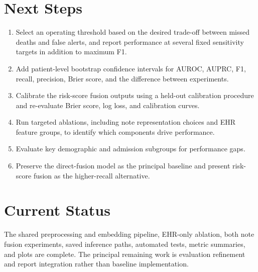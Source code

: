 \documentclass[11pt]{article}
\begin{document}
\section{Next Steps}

\begin{enumerate}
  \item Select an operating threshold based on the desired trade-off between
        missed deaths and false alerts, and report performance at several fixed
        sensitivity targets in addition to maximum F1.
  \item Add patient-level bootstrap confidence intervals for AUROC, AUPRC, F1,
        recall, precision, Brier score, and the difference between experiments.
  \item Calibrate the risk-score fusion outputs using a held-out calibration
        procedure and re-evaluate Brier score, log loss, and calibration curves.
  \item Run targeted ablations, including note representation choices and EHR
        feature groups, to identify which components drive performance.
  \item Evaluate key demographic and admission subgroups for performance gaps.
  \item Preserve the direct-fusion model as the principal baseline and present
        risk-score fusion as the higher-recall alternative.
\end{enumerate}

\section*{Current Status}

The shared preprocessing and embedding pipeline, EHR-only ablation, both note
fusion experiments, saved inference paths, automated tests, metric summaries, and plots
are complete. The principal remaining work is evaluation refinement and report
integration rather than baseline implementation.
\end{document}
